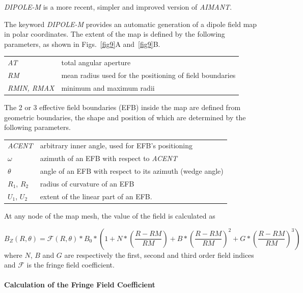 \noindent\textsl{DIPOLE-M} is a more recent, simpler and improved version of 
\textsl{AIMANT}.  
\bigskip

\noindent The keyword \textsl{DIPOLE-M} provides an automatic generation of a dipole 
field map in polar coordinates. The extent of the map is defined by the 
following parameters, as shown in Figs.~\ref{fig9}A and~\ref{fig9}B.
\bigskip

 \begin{tabular}{>{\sl}l!{~:}l}
	 AT &  total angular aperture\\
	 RM & mean radius used for the positioning of field boundaries\\
	 RMIN, RMAX
	    &  minimum and maximum radii 
 \end{tabular}
\bigskip
 
\noindent The 2 or 3 effective field boundaries (EFB) inside the map are
defined from geometric boundaries, the shape and position of which are determined by the 
following parameters. 
\bigskip

\begin{tabular}{l!{~:}l}
	 \textsl{ACENT} 
	    & arbitrary inner angle, used for EFB's positioning  \\
	$\omega$ &  azimuth of an EFB with respect to  \textsl{ACENT}\\
	$\theta$ & angle of an EFB with respect to its azimuth (wedge angle)\\ 
	$R_1$, $R_2$  &  radius of curvature of an EFB\\
	$U_1$, $U_2$  &  extent of the linear part of an EFB. 
\end{tabular}
\bigskip


\noindent At  any node  of the map mesh, the value of the field is calculated as 

 \begin{equation}
	 B_Z(R,\theta)  =  \mathcal{F}(R,\theta)  \ast  B_0 \ast  
	      \left(1+N \ast  
	           \left( \dfrac{R-RM }{ RM}\right) 
	           + B \ast  \left(\dfrac{R-RM }{ RM} \right)^2 
	           + G \ast  \left(\dfrac{R-RM }{ RM} \right)^3 
	      \right) 
 	\label{eq3-3-1}
 \end{equation}
%
 where  $ N$, $B $ and $ G $ are  respectively  the first, second and
third order field indices and $ \mathcal{F}$ is the fringe field coefficient. 


\paragraph{Calculation of the Fringe Field Coefficient} 

